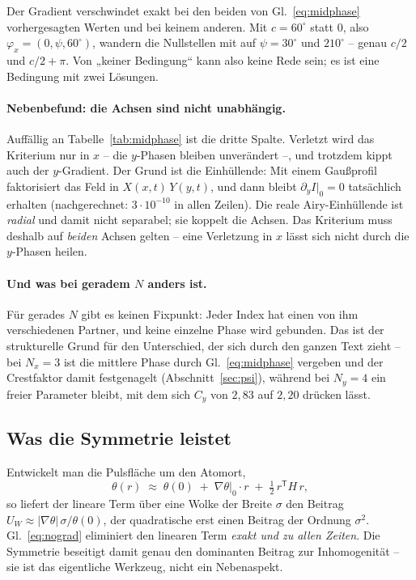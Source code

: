 \documentclass[11pt,a4paper]{article}
\newcommand{\crest}{\ensuremath{C}}
\newcommand{\Uw}{\ensuremath{U_W}}
\begin{document}
\noindent Der Gradient verschwindet exakt bei den beiden von
Gl.~\eqref{eq:midphase} vorhergesagten Werten und bei keinem anderen. Mit
$c = 60^\circ$ statt $0$, also $\varphi_x = (0,\psi,60^\circ)$, wandern die
Nullstellen mit auf $\psi = 30^\circ$ und $210^\circ$ -- genau $c/2$ und
$c/2+\pi$. Von „keiner Bedingung`` kann also keine Rede sein; es ist eine
Bedingung mit zwei Lösungen.

\paragraph{Nebenbefund: die Achsen sind nicht unabhängig.}
Auffällig an Tabelle~\ref{tab:midphase} ist die dritte Spalte. Verletzt wird
das Kriterium nur in $x$ -- die $y$-Phasen bleiben unverändert --, und
trotzdem kippt auch der $y$-Gradient. Der Grund ist die Einhüllende: Mit
einem Gaußprofil faktorisiert das Feld in $X(x,t)\,Y(y,t)$, und dann bleibt
$\partial_y I|_0 = 0$ tatsächlich erhalten (nachgerechnet: $3\cdot10^{-10}$
in allen Zeilen). Die reale Airy-Einhüllende ist \emph{radial} und damit
nicht separabel; sie koppelt die Achsen. Das Kriterium muss deshalb auf
\emph{beiden} Achsen gelten -- eine Verletzung in $x$ lässt sich nicht durch
die $y$-Phasen heilen.

\paragraph{Und was bei geradem \boldmath$N$ anders ist.}
Für gerades $N$ gibt es keinen Fixpunkt: Jeder Index hat einen von ihm
verschiedenen Partner, und keine einzelne Phase wird gebunden. Das ist der
strukturelle Grund für den Unterschied, der sich durch den ganzen Text zieht
-- bei $N_x = 3$ ist die mittlere Phase durch Gl.~\eqref{eq:midphase}
vergeben und der Crestfaktor damit festgenagelt
(Abschnitt~\ref{sec:psi}), während bei $N_y = 4$ ein freier Parameter bleibt,
mit dem sich $\crest_y$ von $2{,}83$ auf $2{,}20$ drücken lässt.

\subsection{Was die Symmetrie leistet}

Entwickelt man die Pulsfläche um den Atomort,
\begin{equation}
  \theta(r) \;\approx\; \theta(0) \;+\; \nabla\theta\big|_0\cdot r
  \;+\; \tfrac{1}{2}\,r^{\mathsf{T}} H\, r ,
  \label{eq:taylor}
\end{equation}
so liefert der lineare Term über eine Wolke der Breite $\sigma$ den Beitrag
$\Uw \approx |\nabla\theta|\,\sigma/\theta(0)$, der quadratische erst einen
Beitrag der Ordnung $\sigma^{2}$. Gl.~\eqref{eq:nograd} eliminiert den
linearen Term \emph{exakt und zu allen Zeiten}. Die Symmetrie beseitigt damit
genau den dominanten Beitrag zur Inhomogenität -- sie ist das eigentliche
Werkzeug, nicht ein Nebenaspekt.
\end{document}

